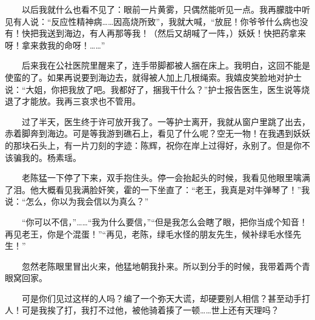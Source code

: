  　　以后我就什么也看不见了：眼前一片黄雾，只偶然能听见一点。我再朦胧中听见有人说：“反应性精神病……因高烧所致”，我就大喊，“放屁！你爷爷什么病也没有！快把我送到海边，有人再那等我！（然后又胡喊了一阵，）妖妖！快把药拿来呀！拿来救我的命呀！……” 
 
 　　后来我在公社医院里醒来了，连手带脚都被人捆在床上。我明白，这回不能是使蛮的了。如果再说要到海边去，就得被人加上几根绳索。我嬉皮笑脸地对护士说：“大姐，你把我放了吧。我都好了，捆我干什么？”护士报告医生，医生说等烧退了才能放。我再三哀求也不管用。 
 
 　　过了半天，医生终于许可放开我了。一等护士离开，我就从窗户里跳了出去，赤着脚奔到海边。可是等我游到礁石上，看见了什么呢？空无一物！在我遇到妖妖的那块石头上，有一片刀刻的字迹：陈辉，祝你在岸上过得好，永别了。但是你不该骗我的。杨素瑶。 
 
 　　老陈猛一下停了下来，双手抱住头。停一会抬起头的时候，我看见他眼里噙满了泪。他大概看见我满脸奸笑，霍的一下坐直了：“老王，我真是对牛弹琴了！”我说：“怎么，你以为我会信以为真么？” 
 
 　　“你可以不信，”……“我为什么要信，”“但是我怎么会瞎了眼，把你当成个知音！再见老王，你是个混蛋！”“再见，老陈，绿毛水怪的朋友先生，候补绿毛水怪先生！” 
 
 　　忽然老陈眼里冒出火来，他猛地朝我扑来。所以到分手的时候，我带着两个青眼窝回家。 
 
 　　可是你们见过这样的人吗？编了一个弥天大谎，却硬要别人相信？甚至动手打人！可是我挨了打，我打不过他，被他骑着揍了一顿……世上还有天理吗？ 
 
